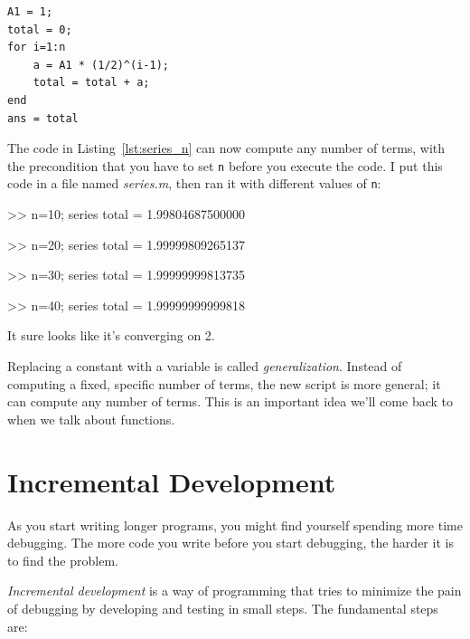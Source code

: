 \documentclass[../../book.tex]{subfiles}
\begin{document}
\begin{lstlisting}[caption={Updating our code from Listing~\ref{lst:series_10} to have a variable number of terms}, label={lst:series_n}]
A1 = 1;
total = 0;
for i=1:n
    a = A1 * (1/2)^(i-1);
    total = total + a;
end
ans = total
\end{lstlisting}

The code in Listing~\ref{lst:series_n} can now compute any number of terms, with the
precondition that you have to set \lstinline{n} before you execute
the code.
I put this code in a file named \emph{series.m}, then
ran it with different values of \lstinline{n}:

\begin{code}
>> n=10; series
total = 1.99804687500000

>> n=20; series
total = 1.99999809265137

>> n=30; series
total = 1.99999999813735

>> n=40; series
total = 1.99999999999818
\end{code}

It sure looks like it's converging on 2.

Replacing a constant with a variable is called \emph{generalization}.
Instead of computing a fixed, specific number of terms, the new script
is more general; it can compute any number of terms.
This is an important idea we'll come back to when we talk about functions.

\section{Incremental Development}


As you start writing longer programs, you might find yourself spending more time debugging.
The more code you write before you start debugging, the harder it is to find
the problem.

\emph{Incremental development} is a way of programming that tries
to minimize the pain of debugging by developing and testing in small steps.  The fundamental steps are:
\end{document}
